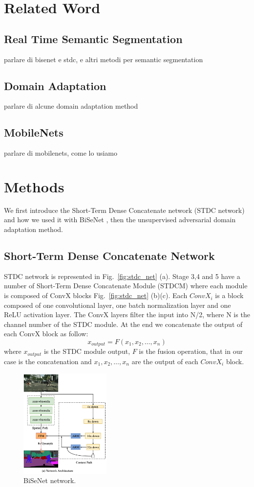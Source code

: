 \documentclass[conference]{IEEEtran}
\begin{document}
\section{Related Word}

\subsection{Real Time Semantic Segmentation}
parlare di bisenet e stdc, e altri metodi per semantic segmentation
\subsection{Domain Adaptation}
parlare di alcune domain adaptation method
\subsection{MobileNets}
parlare di mobilenets, come lo usiamo 
\section{Methods}

We first introduce the Short-Term Dense Concatenate network (STDC network) and how we used it with BiSeNet \cite{b2},
then the unsupervised adversarial domain adaptation method.

\subsection{Short-Term Dense Concatenate Network}

STDC network \cite{b1} is represented in Fig.~\ref{fig:stdc_net} (a). Stage 3,4 and 5 have a number of Short-Term Dense Concatenate Module (STDCM)
where each module is composed of ConvX blocks Fig.~\ref{fig:stdc_net} (b)(c). Each \(ConvX_i\) is a block composed of one convolutional layer,
one batch normalization layer and one ReLU activation layer. The ConvX layers filter the input into N/2, where N is the channel number
of the STDC module. At the end we concatenate the output of each ConvX block as follow: 
\[x_{output} = F(x_1,x_2,\dots,x_n)\]
where \(x_{output}\) is the STDC module output, \(F\) is the fusion operation, that in our case is the concatenation and \(x_1,x_2,
\dots,x_n\) are the output of each \(ConvX_i\) block.

\begin{figure}[tp]
\centerline{\includegraphics[width=0.4\textwidth]{figures/BiSeNet}}
\caption{BiSeNet network.}
\label{fig:bisenet}
\end{figure}
\end{document}
